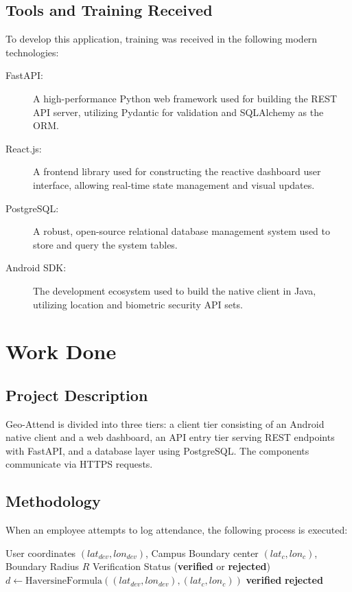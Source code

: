 \documentclass[12pt]{report}
\begin{document}
{\section{Tools and Training Received}
To develop this application, training was received in the following modern technologies:
\begin{description}
    \item[FastAPI:] A high-performance Python web framework used for building the REST API server, utilizing Pydantic for validation and SQLAlchemy as the ORM.
    \item[React.js:] A frontend library used for constructing the reactive dashboard user interface, allowing real-time state management and visual updates.
    \item[PostgreSQL:] A robust, open-source relational database management system used to store and query the system tables.
    \item[Android SDK:] The development ecosystem used to build the native client in Java, utilizing location and biometric security API sets.
\end{description}


\chapter{Work Done}

\section{Project Description}
Geo-Attend is divided into three tiers: a client tier consisting of an Android native client and a web dashboard, an API entry tier serving REST endpoints with FastAPI, and a database layer using PostgreSQL. The components communicate via HTTPS requests.

\section{Methodology}
When an employee attempts to log attendance, the following process is executed:
\begin{algorithm}
\caption{Attendance Log Geofence Verification}
\begin{algorithmic}[1]
\Require User coordinates $(lat_{dev}, lon_{dev})$, Campus Boundary center $(lat_{c}, lon_{c})$, Boundary Radius $R$
\Ensure Verification Status (\textbf{verified} or \textbf{rejected})
\State $d \leftarrow \text{HaversineFormula}((lat_{dev}, lon_{dev}), (lat_{c}, lon_{c}))$
    \State \Return \textbf{verified}
\Else
    \State \Return \textbf{rejected}
\EndIf
\end{algorithmic}
\end{algorithm}

}
\end{document}
